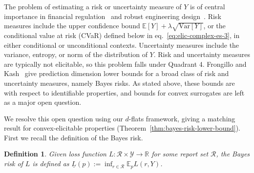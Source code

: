 \documentclass{article} %
\newcommand{\Comments}{0}
\newcommand{\mytodo}[2]{\ifnum\Comments=1%
	\todo[linecolor=#1!80!black,backgroundcolor=#1,bordercolor=#1!80!black]{#2}\fi}
\newcommand{\jessiet}[1]{\mytodo{teal!20!white}{JF: #1}}
\newcommand{\reals}{\mathbb{R}}
\newcommand{\E}{\mathbb{E}}
\newcommand{\R}{\mathcal{R}}
\newcommand{\Y}{\mathcal{Y}}
\newcommand{\lbar}{\underline{L}} %
\newcommand{\Var}{\mathrm{Var}}
\newtheorem{definition}{Definition}
\begin{document}
The problem of estimating a risk or uncertainty measure of $Y$ is of central importance in financial regulation~\cite{acerbi2014back-testing,fissler2016expected,campbell2005review} and robust engineering design~\cite{shahbaz2016surrogate-based,beyer2007robust,rockafellar2010buffered}.
Risk measures include the upper confidence bound $\E[Y] + \lambda \sqrt{\Var[Y]}$, or the conditional value at risk (CVaR) defined below in eq.~\eqref{eq:elic-complex-es-3}, in either conditional or unconditional contexts.
Uncertainty measures include the variance, entropy, or norm of the distribution of $Y$.
Risk and uncertainty measures are typically not elicitable, so this problem falls under Quadrant 4.
Frongillo and Kash~\citep{frongillo2020elicitation,frongillo2015elicitation} give prediction dimension lower bounds for a broad class of risk and uncertainty measures, namely Bayes risks.
As stated above, these bounds are with respect to identifiable properties, and bounds for convex surrogates are left as a major open question.

We resolve this open question using our $d$-flats framework, giving a matching result for convex-elicitable properties (Theorem~\ref{thm:bayes-risk-lower-bound}).
First we recall the definition of the Bayes risk.

\begin{definition}
  \label{def:bayes-risk}
  Given loss function $L:\R\times\Y \to \reals$ for some report set $\R$, the \emph{Bayes risk} of $L$ is defined as $\lbar(p) := \inf_{r \in \R} \E_pL(r,Y)$.
\end{definition}

\end{document}
